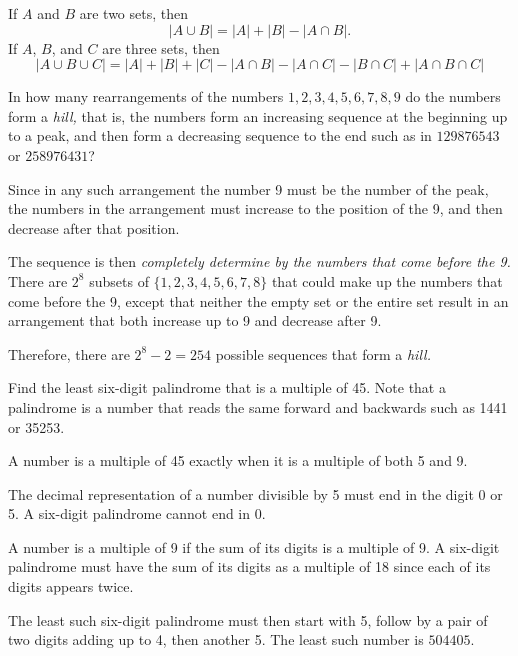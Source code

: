 \documentclass{article}
\begin{document}
\begin{theorem*}
    \label{theorem:inclusion-exclusion-principle}
    If $A$ and $B$ are two sets, then 
    \[ 
        |A \cup B| = |A| + |B| - |A \cap B|.
    \] 
    If $A$, $B$, and $C$ are three sets, then 
    \[
        |A \cup B \cup C| = |A| + |B| + |C| - |A \cap B| - |A \cap C| - |B \cap C| + |A \cap B \cap C|
    \]
\end{theorem*}

\newpage

\begin{example}
    In how many rearrangements of the numbers $1, 2, 3, 4, 5, 6, 7, 8, 9$ do the numbers form a \textit{hill,}
    that is, the numbers form an increasing sequence at the beginning up to a peak,
    and then form a decreasing sequence to the end such as in $129876543$ or $258976431$?
\end{example}

\begin{soln}
    Since in any such arrangement the number 9 must be the number of the peak,
    the numbers in the arrangement must increase to the position of the 9, and then decrease after that position.

    The sequence is then \textit{completely determine by the numbers that come before the 9.}
    There are $2^8$ subsets of $\{1, 2, 3, 4, 5, 6, 7, 8\}$ that could make up the numbers that come before the 9,
    except that neither the empty set or the entire set result in an arrangement that both increase up to 9 and decrease after 9.

    Therefore, there are $2^8 - 2 = \boxed{254}$ possible sequences that form a \textit{hill.}
\end{soln}

\begin{example}
    Find the least six-digit palindrome that is a multiple of 45.
    Note that a palindrome is a number that reads the same forward and backwards such as 1441 or 35253.
\end{example}

\begin{soln}
    A number is a multiple of 45 exactly when it is a multiple of both 5 and 9. 
    
    The decimal representation of a number divisible by 5 must end in the digit 0 or 5.
    A six-digit palindrome cannot end in 0.

    A number is a multiple of 9 if the sum of its digits is a multiple of 9.
    A six-digit palindrome must have the sum of its digits as a multiple of 18 since each of its digits appears twice.
    
    The least such six-digit palindrome must then start with 5, follow by a pair of two digits adding up to 4, then another 5.
    The least such number is $\boxed{504405.}$
\end{soln}
\end{document}
